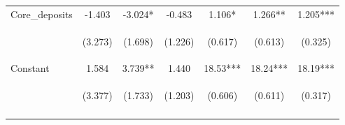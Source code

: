 \documentclass[]{article}
\begin{document}
\begin{center}
\begin{tabular}{lcccccc}
Core\_deposits & -1.403 & -3.024* & -0.483 & 1.106* & 1.266** & 1.205*** \\
\vspace{4pt} & \begin{footnotesize}(3.273)\end{footnotesize} & \begin{footnotesize}(1.698)\end{footnotesize} & \begin{footnotesize}(1.226)\end{footnotesize} & \begin{footnotesize}(0.617)\end{footnotesize} & \begin{footnotesize}(0.613)\end{footnotesize} & \begin{footnotesize}(0.325)\end{footnotesize} \\
Constant & 1.584 & 3.739** & 1.440 & 18.53*** & 18.24*** & 18.19*** \\
 & \begin{footnotesize}(3.377)\end{footnotesize} & \begin{footnotesize}(1.733)\end{footnotesize} & \begin{footnotesize}(1.203)\end{footnotesize} & \begin{footnotesize}(0.606)\end{footnotesize} & \begin{footnotesize}(0.611)\end{footnotesize} & \begin{footnotesize}(0.317)\end{footnotesize} \\
\vspace{4pt} & \begin{footnotesize}\end{footnotesize} & \begin{footnotesize}\end{footnotesize} & \begin{footnotesize}\end{footnotesize} & \begin{footnotesize}\end{footnotesize} & \begin{footnotesize}\end{footnotesize} & \begin{footnotesize}\end{footnotesize} \\

\end{tabular}
\end{center}
\end{document}
